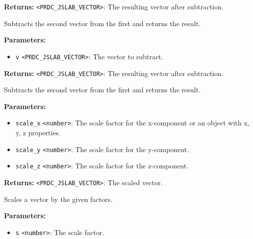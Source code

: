 \documentclass[12pt,a4paper]{article}
\begin{document}
\noindent \textbf{Returns:} \texttt{<PRDC\_JSLAB\_VECTOR>}: The resulting vector after subtraction.

\noindent Subtracts the second vector from the first and returns the result.

\vspace{5mm}
\noindent {}


\noindent \textbf{Parameters:}
\begin{itemize}
  \item \texttt{v} \texttt{<PRDC\_JSLAB\_VECTOR>}: The vector to subtract.
\end{itemize}

\noindent \textbf{Returns:} \texttt{<PRDC\_JSLAB\_VECTOR>}: The resulting vector after subtraction.

\noindent Subtracts the second vector from the first and returns the result.

\vspace{5mm}
\noindent {}


\noindent \textbf{Parameters:}
\begin{itemize}
  \item \texttt{scale\_x} \texttt{<number>}: The scale factor for the x-component or an object with x, y, z properties.
  \item \texttt{scale\_y} \texttt{<number>}: The scale factor for the y-component.
  \item \texttt{scale\_z} \texttt{<number>}: The scale factor for the z-component.
\end{itemize}

\noindent \textbf{Returns:} \texttt{<PRDC\_JSLAB\_VECTOR>}: The scaled vector.

\noindent Scales a vector by the given factors.

\vspace{5mm}
\noindent {}


\noindent \textbf{Parameters:}
\begin{itemize}
  \item \texttt{s} \texttt{<number>}: The scale factor.
\end{itemize}
\end{document}
